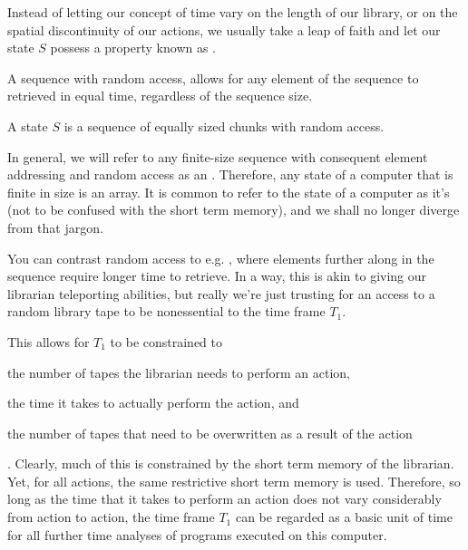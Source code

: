 Instead of letting our concept of time vary on the length of our library, or on
the spatial discontinuity of our actions, we usually take a leap of faith and
let our state $S$ possess a property known as .

\begin{definition}

A sequence with random access, allows for any element of the sequence to
retrieved in equal time, regardless of the sequence size.

\end{definition}

\begin{definition}

A state $S$ is a sequence of equally sized chunks with random access.

\end{definition}

In general, we will refer to any finite-size sequence with consequent element
addressing and random access as an . Therefore, any state of a
computer that is finite in size is an array. It is common to refer to the state
of a computer as it's  (not to be confused with the short term
memory), and we shall no longer diverge from that jargon.

You can contrast random access to e.g. , where elements
further along in the sequence require longer time to retrieve. In a way, this
is akin to giving our librarian teleporting abilities, but really we're just
trusting for an access to a random library tape to be nonessential to the time
frame $T_1$. 

This allows for $T_1$ to be constrained to \begin{inparaenum}[(1)] \item the
number of tapes the librarian needs to perform an action, \item the time it
takes to actually perform the action, and \item the number of tapes that need
to be overwritten as a result of the action\end{inparaenum}. Clearly, much of
this is constrained by the short term memory of the librarian.  Yet, for all
actions, the same restrictive short term memory is used.  Therefore, so long as
the time that it takes to perform an action does not vary considerably from
action to action, the time frame $T_1$ can be regarded as a basic unit of time
for all further time analyses of programs executed on this computer. 

